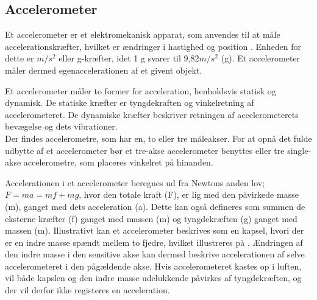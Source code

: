 \subsection{Accelerometer}
Et accelerometer er et elektromekanisk apparat, som anvendes til at måle accelerationskræfter, hvilket er ændringer i hastighed og position \citep{Goodrich2013,TittertonWeston2004}. Enheden for dette er $m/s^2$ eller g-kræfter, idet 1 g svarer til 9,82$m/s^2$ (g). Et accelerometer måler dermed egenaccelerationen af et givent objekt. \citep{Sparkfun,TittertonWeston2004} \newline

Et accelerometer måler to former for acceleration, henholdsvis statisk og dynamisk. De statiske kræfter er tyngdekraften og vinkelretning af accelerometeret. De dynamiske kræfter beskriver retningen af accelerometerets bevægelse og dets vibrationer. \citep{Sparkfun,Engineering, Goodrich2013} \\
Der findes accelerometre, som har en, to eller tre måleakser. For at opnå det fulde udbytte af et accelerometer bør et tre-akse accelerometer benyttes eller tre single-akse accelerometre, som placeres vinkelret på hinanden. \citep{TittertonWeston2004} 

Accelerationen i et accelerometer beregnes ud fra Newtons anden lov; $F=ma=mf+mg$, hvor den totale kraft (F), er lig med den påvirkede masse (m), ganget med dets acceleration (a). Dette kan også defineres som summen de eksterne kræfter (f) ganget med massen (m) og tyngdekræften (g) ganget med massen (m). \citep{TittertonWeston2004,Academic2016d} \newline
Illustrativt kan et accelerometer beskrives som en kapsel, hvori der er en indre masse spændt mellem to fjedre, hvilket illustreres på . Ændringen af den indre masse i den sensitive akse kan dermed beskrive accelerationen af selve accelerometeret i den pågældende akse. Hvis accelerometeret kastes op i luften, vil både kapslen og den indre masse udelukkende påvirkes af tyngdekræften, og der vil derfor ikke registeres en acceleration.\citep{TittertonWeston2004,Academic2016d} \newline


